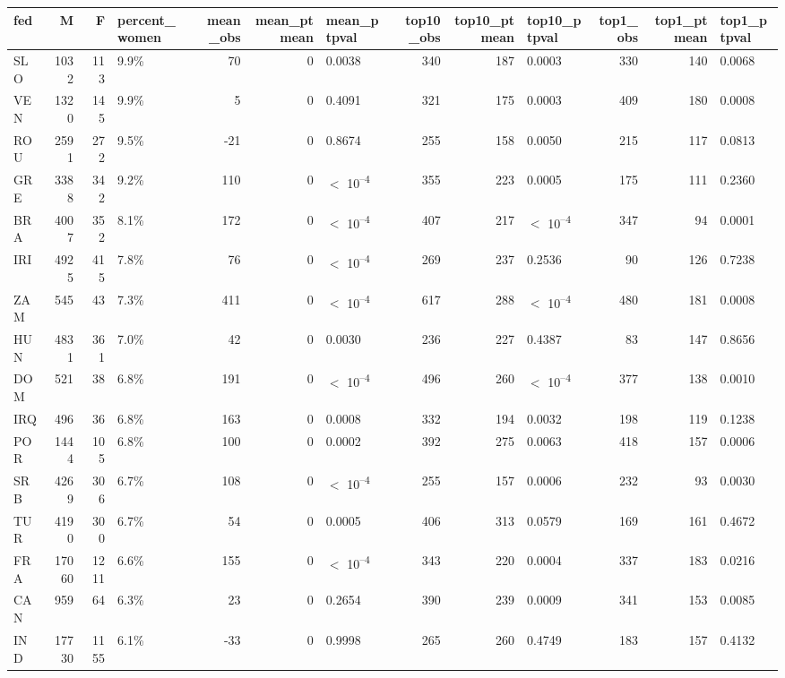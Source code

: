 
\begin{tabular}{l|r|r|l|r|r|l|r|r|l|r|r|l}
\hline
fed & M & F & percent_women & mean_obs & mean_ptmean & mean_ptpval & top10_obs & top10_ptmean & top10_ptpval & top1_obs & top1_ptmean & top1_ptpval\\
\hline
SLO & 1032 & 113 & 9.9\% & 70 & 0 & 0.0038 & 340 & 187 & 0.0003 & 330 & 140 & 0.0068\\
\hline
VEN & 1320 & 145 & 9.9\% & 5 & 0 & 0.4091 & 321 & 175 & 0.0003 & 409 & 180 & 0.0008\\
\hline
ROU & 2591 & 272 & 9.5\% & -21 & 0 & 0.8674 & 255 & 158 & 0.0050 & 215 & 117 & 0.0813\\
\hline
GRE & 3388 & 342 & 9.2\% & 110 & 0 & $<$ 10\textsuperscript{--4} & 355 & 223 & 0.0005 & 175 & 111 & 0.2360\\
\hline
BRA & 4007 & 352 & 8.1\% & 172 & 0 & $<$ 10\textsuperscript{--4} & 407 & 217 & $<$ 10\textsuperscript{--4} & 347 & 94 & 0.0001\\
\hline
IRI & 4925 & 415 & 7.8\% & 76 & 0 & $<$ 10\textsuperscript{--4} & 269 & 237 & 0.2536 & 90 & 126 & 0.7238\\
\hline
ZAM & 545 & 43 & 7.3\% & 411 & 0 & $<$ 10\textsuperscript{--4} & 617 & 288 & $<$ 10\textsuperscript{--4} & 480 & 181 & 0.0008\\
\hline
HUN & 4831 & 361 & 7.0\% & 42 & 0 & 0.0030 & 236 & 227 & 0.4387 & 83 & 147 & 0.8656\\
\hline
DOM & 521 & 38 & 6.8\% & 191 & 0 & $<$ 10\textsuperscript{--4} & 496 & 260 & $<$ 10\textsuperscript{--4} & 377 & 138 & 0.0010\\
\hline
IRQ & 496 & 36 & 6.8\% & 163 & 0 & 0.0008 & 332 & 194 & 0.0032 & 198 & 119 & 0.1238\\
\hline
POR & 1444 & 105 & 6.8\% & 100 & 0 & 0.0002 & 392 & 275 & 0.0063 & 418 & 157 & 0.0006\\
\hline
SRB & 4269 & 306 & 6.7\% & 108 & 0 & $<$ 10\textsuperscript{--4} & 255 & 157 & 0.0006 & 232 & 93 & 0.0030\\
\hline
TUR & 4190 & 300 & 6.7\% & 54 & 0 & 0.0005 & 406 & 313 & 0.0579 & 169 & 161 & 0.4672\\
\hline
FRA & 17060 & 1211 & 6.6\% & 155 & 0 & $<$ 10\textsuperscript{--4} & 343 & 220 & 0.0004 & 337 & 183 & 0.0216\\
\hline
CAN & 959 & 64 & 6.3\% & 23 & 0 & 0.2654 & 390 & 239 & 0.0009 & 341 & 153 & 0.0085\\
\hline
IND & 17730 & 1155 & 6.1\% & -33 & 0 & 0.9998 & 265 & 260 & 0.4749 & 183 & 157 & 0.4132\\

\end{tabular}
